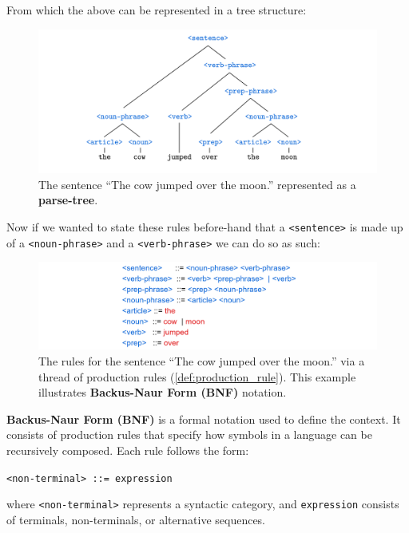 \noindent
From which the above can be represented in a tree structure:
\begin{figure}[h]
    \centering
    \includegraphics[width=1\textwidth]{Sections/Formal/tree.png}
    \caption{The sentence ``The cow jumped over the moon.'' represented as a \textbf{parse-tree}.}
\end{figure}

\newpage

\noindent
Now if we wanted to state these rules before-hand that a \texttt{<sentence>} is made up of a \texttt{<noun-phrase>} and a \texttt{<verb-phrase>} we can do so as such:

\begin{figure}[h]
    \centering
    \includegraphics[width=1\textwidth]{Sections/Formal/bnf.png}
    \caption{The rules for the sentence ``The cow jumped over the moon.'' via a thread of production rules (\ref{def:production_rule}). This example illustrates \textbf{Backus-Naur Form (BNF)} notation.}
\end{figure}

\vspace{-1em}
\begin{Def}

    \textbf{Backus-Naur Form (BNF)} is a formal notation used to define the context. It consists of production rules that specify how symbols in a language can be recursively composed. Each rule follows the form:
    
    \begin{center}
    \texttt{<non-terminal> ::= expression}
    \end{center}
    
    \noindent
    where \texttt{<non-terminal>} represents a syntactic category, and \texttt{expression} consists of terminals, non-terminals, or alternative sequences.
    
    \end{Def}

